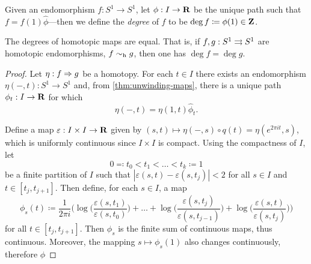 \begin{definition}[Degree]
\label{def:degree-S1-map}
Given an endomorphism \(f: S^1 \to S^1\), let \(\phi: I \to \mathbf{R}\) be the unique
path such that \(f = f(1) \widehat \phi\)---then we define the \emph{degree} of
\(f\) to be \(\deg f \coloneq \phi(1) \in \mathbf{Z}\).
\end{definition}

\begin{lemma}
\label{lem:homotopic-S1-maps-have-equal-degree}
The degrees of homotopic maps are equal. That is, if \(f, g: S^1 \rightrightarrows S^1\) are
homotopic endomorphisms, \(f \sim_{\text{h}} g\), then one has \(\deg f = \deg g\).
\end{lemma}

\begin{proof}
Let \(\eta: f \Rightarrow g\) be a homotopy. For each \(t \in I\) there exists an
endomorphism \(\eta(-, t): S^1 \to S^1\) and, from \cref{thm:unwinding-maps},
there is a unique path \(\phi_t: I \to \mathbf{R}\) for which
\[
\eta(-, t) = \eta(1, t) \widehat \phi_t.
\]

Define a map \(\varepsilon: I \times I \to \mathbf{R}\) given by
\((s, t) \mapsto \eta(-, s) \circ q(t) = \eta(e^{2 \pi i t}, s)\), which is
uniformly continuous since \(I \times I\) is compact. Using the compactness of
\(I\), let
\[
0 \eqqcolon t_0 < t_1 < \dots < t_k \coloneq 1
\]
be a finite partition of \(I\) such that
\(|\varepsilon(s, t) - \varepsilon(s, t_j)| < 2\) for all \(s \in I\) and
\(t \in [t_j, t_{j+1}]\). Then define, for each \(s \in I\), a map
\[
\phi_s(t) \coloneq \frac{1}{2 \pi i} \bigg(
\log\Big( \frac{\varepsilon(s, t_{1})}{\varepsilon(s, t_{0})} \Big)
+ \dots +
\log\Big( \frac{\varepsilon(s, t_j)}{\varepsilon(s, t_{j-1})} \Big)
+
\log\Big( \frac{\varepsilon(s, t)}{\varepsilon(s, t_{j})} \Big)
\bigg)
\]
for all \(t \in [t_j, t_{j+1}]\). Then \(\phi_s\) is the finite sum of
continuous maps, thus continuous. Moreover, the mapping \(s \mapsto \phi_s(1)\)
also changes continuously, therefore \(\phi\)
\end{proof}